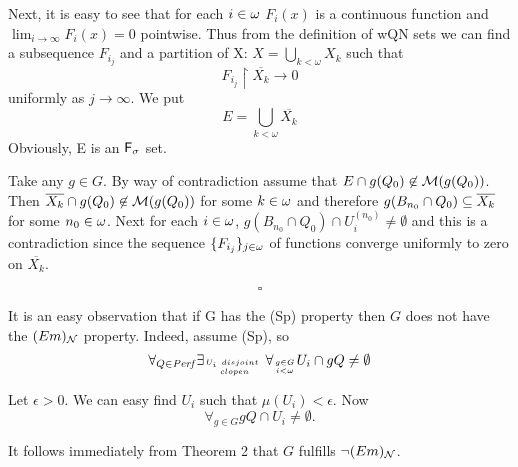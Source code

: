Next, it is easy to see that for each $i\in\omega$ $F_i(x)$ is
a continuous function and
$\lim_{i \rightarrow \infty} F_i(x) = 0$
pointwise.
  Thus from the definition of wQN sets we can find a subsequence
$F_{i_j}$ and a partition of X:
$X = \bigcup_{k<\omega} X_k $
such that $$F_{i_j} \restriction \overline{ X_k} \rightarrow 0$$
uniformly as $j \rightarrow \infty$.
  We put
  \[ E = \bigcup_{k<\omega} \overline{X_k} \]
Obviously, E is an ${\sf F}_{\sigma}$ set.

Take any $g \in G$.
By way of contradiction assume that
$E \cap g(Q_0) \not\in {\cal M}(g(Q_0))$.
Then $\overline{X_k} \cap g(Q_0) \not\in {\cal M}(g(Q_0))$
for some $k \in \omega$ and therefore
$g(B_{n_0} \cap Q_0) \subseteq \overline{X_k}$
for some $n_0 \in \omega$.
  Next for each $i \in \omega$,
$g(B_{n_0} \cap Q_0) \cap U^{(n_0)}_i \not= \emptyset$
and this is a contradiction since the sequence
$\lbrace F_{i_j} \rbrace_{j \in \omega}$ of functions converge
uniformly to zero on $\overline{X_k}$.


\smallskip
  \[ \square \]


\bigskip
\bigskip

  It is an easy observation that if G has the (Sp) property
then $G$ does not have the $(Em)_{{\cal N}}$ property.
Indeed, assume (Sp), so
\[ \forall_{Q \in \perf} \exists_{U_i\ disjoint\ \atop clopen }

\forall_{g \in G \atop i < \omega} U_i \cap gQ \not = \emptyset \]

 Let $\epsilon > 0$.
We can easy find $U_i$ such that $\mu (U_i) < \epsilon$.
Now
\[ \forall_{g \in G} gQ \cap U_i \not = \emptyset. \]

It follows immediately from Theorem 2 that
$G$ fulfills $\neg (Em)_{{\cal N}}$.

